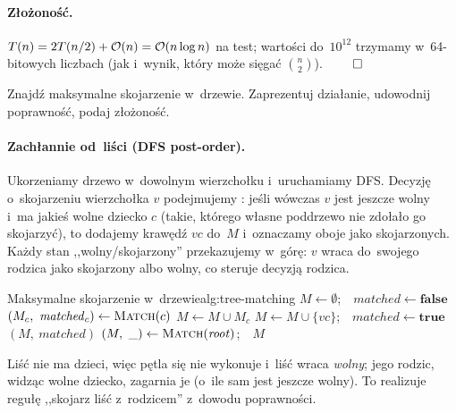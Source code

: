 \paragraph{Złożoność.}
$T(n)=2T(n/2)+\mathcal{O}(n)=\mathcal{O}(n\log n)$ na test; wartości do~$10^{12}$ trzymamy
w~64-bitowych liczbach (jak i~wynik, który może sięgać $\binom{n}{2}$). $\qed$

\clearpage
\begin{zadanie}
	Znajdź maksymalne skojarzenie w~drzewie. Zaprezentuj działanie, udowodnij
	poprawność, podaj złożoność.
\end{zadanie}

\paragraph{Zachłannie od~liści (DFS post-order).}
Ukorzeniamy drzewo w~dowolnym wierzchołku i~uruchamiamy DFS. Decyzję
o~skojarzeniu wierzchołka $v$ podejmujemy : jeśli wówczas $v$ jest jeszcze wolny i~ma jakieś
wolne dziecko $c$ (takie, którego własne poddrzewo nie zdołało go skojarzyć),
to dodajemy krawędź $vc$ do~$M$ i~oznaczamy oboje jako skojarzonych. Każdy stan
,,wolny/skojarzony'' przekazujemy w~górę: $v$ wraca do~swojego rodzica jako
skojarzony albo wolny, co steruje decyzją rodzica.

\begin{alg}{Maksymalne skojarzenie w~drzewie}{alg:tree-matching}
	\State $M\gets\emptyset$;\ \ $\mathit{matched}\gets\textbf{false}$
	\State $(M_c,\ \mathit{matched}_c)\gets\Call{Match}{c}$
	\State $M\gets M\cup M_c$
	\State $M\gets M\cup\{vc\}$;\ \ $\mathit{matched}\gets\textbf{true}$
	\EndIf
	\EndFor
	\State \Return $(M,\ \mathit{matched})$
	\EndFunction
	\Statex
	\State $(M,\ \_)\gets\Call{Match}{\mathit{root}}$;\ \ \Return $M$
\end{alg}

Liść nie ma dzieci, więc pętla się nie wykonuje i~liść wraca \emph{wolny};
jego rodzic, widząc wolne dziecko, zagarnia je (o~ile sam jest jeszcze wolny).
To realizuje regułę ,,skojarz liść z~rodzicem'' z~dowodu poprawności.

